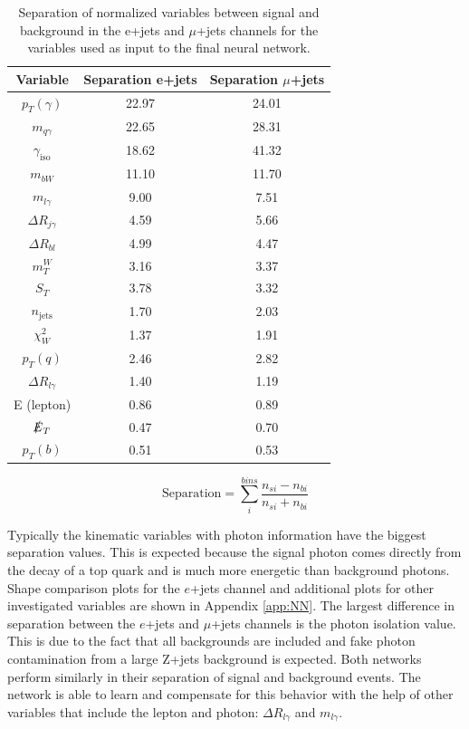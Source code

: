 \begin{table}[]
\begin{center}
{\renewcommand{\arraystretch}{1.2}
\begin{tabular}{ccc}
\hline
Variable  &  Separation e+jets   & Separation $\mu$+jets   \\  \hline 
$p_T (\gamma)$            &  22.97   & 24.01	\\
$m_{q\gamma}$           &   22.65 &  28.31	\\
$\gamma_{\text{iso}}$   &  18.62   &  41.32	\\   
$m_{bW} $                    &  11.10   &  11.70 	\\
$m_{l\gamma}$             &  9.00  &   7.51	\\
$\Delta R_{j\gamma}$ &  4.59   &  5.66	\\
$\Delta R_{b l}$            &  4.99   &  4.47 	\\
$m_{T}^{W}$              &   3.16  &   3.37	\\
$S_T$                            &  3.78   &  3.32 	\\
$n_{\text{jets}}$         &  1.70   &   2.03	\\
$\chi^{2}_{W}$           &  1.37 &   1.91	 	\\
$p_T (q)$                      &  2.46    &  2.82	\\
$\Delta R_{l \gamma}$ &   1.40 &  1.19		\\
E (lepton)                       &  0.86  &  0.89	\\	
$\slashed{E}_T  $          &   0.47  & 0.70 	\\
$p_T (b)$                       &  0.51    &  0.53	\\ \hline
\end{tabular}
\caption{Separation of normalized variables between signal and background in the e+jets and $\mu$+jets channels for the variables used as input to the final neural network.  }
\label{tab:Separations}
}
\end{center}
\end{table}

\[ \text{Separation} = \sum_{i}^{bins} \frac {n_{s i}-n_{b i}}{n_{s i}+n_{b i}}\]

Typically the kinematic variables with photon information have the biggest separation values.  This is expected because the signal photon comes directly from the decay of a top quark and is much more energetic than background photons.  Shape comparison plots for the $e$+jets channel and additional plots for other investigated variables are shown in Appendix \ref{app:NN}.  The largest difference in separation between the $e$+jets and $\mu$+jets channels is the photon isolation value.  This is due to the fact that all backgrounds are included and fake photon contamination from a large Z+jets background is expected.  Both networks perform similarly in their separation of signal and background events.  The network is able to learn and compensate for this behavior with the help of other variables that include the lepton and photon: $\Delta R_{l \gamma}$ and $m_{l\gamma}$.


